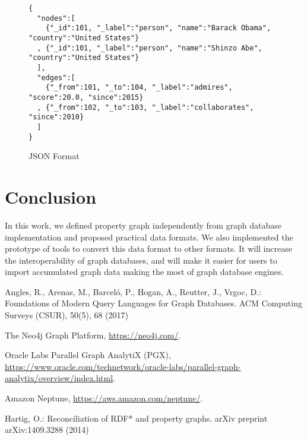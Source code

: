 \documentclass[runningheads]{llncs}
\begin{document}
\begin{figure}[!t]
\vspace{2mm}
\begin{scriptsize}
\begin{verbatim}
{
  "nodes":[
    {"_id":101, "_label":"person", "name":"Barack Obama", "country":"United States"}
  , {"_id":101, "_label":"person", "name":"Shinzo Abe", "country":"United States"}
  ],
  "edges":[
    {"_from":101, "_to":104, "_label":"admires", "score":20.0, "since":2015}
  , {"_from":102, "_to":103, "_label":"collaborates", "since":2010}
  ]
}
\end{verbatim}
\end{scriptsize}
\caption{JSON Format}
\label{fig:format-jsonpg}
\end{figure}

\section{Conclusion}
In this work, we defined property graph independently from graph database implementation and proposed practical data formats. We also implemented the prototype of tools to convert this data format to other formats. 
It will increase the interoperability of graph databases, and will make it easier for users to import accumulated graph data making the most of graph database engines.

%
%
%
% 
% 
%
\begin{thebibliography}{8}

Angles, R., Arenas, M., Barceló, P., Hogan, A., Reutter, J., Vrgoc, D.: Foundations of Modern Query Languages for Graph Databases. ACM Computing Surveys (CSUR), 50(5), 68 (2017)

The Neo4j Graph Platform, \url{https://neo4j.com/}.

Oracle Labs Parallel Graph AnalytiX (PGX), \url{https://www.oracle.com/technetwork/oracle-labs/parallel-graph-analytix/overview/index.html}.

Amazon Neptune, \url{https://aws.amazon.com/neptune/}.

Hartig, O.: Reconciliation of RDF* and property graphs. arXiv preprint arXiv:1409.3288 (2014)

\end{thebibliography}
\end{document}
